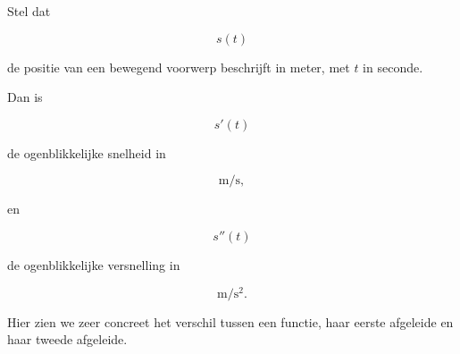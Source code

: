 \documentclass{ximera}
\begin{document}
\begin{voorbeeld}[Beweging]

Stel dat

\[
s(t)
\]

de positie van een bewegend voorwerp beschrijft in meter,
met $t$ in seconde.

Dan is

\[
s'(t)
\]

de ogenblikkelijke snelheid in

\[
\mathrm{m/s},
\]

en

\[
s''(t)
\]

de ogenblikkelijke versnelling in

\[
\mathrm{m/s^2}.
\]

Hier zien we zeer concreet het verschil tussen een functie,
haar eerste afgeleide en haar tweede afgeleide.

\end{voorbeeld}
\end{document}
